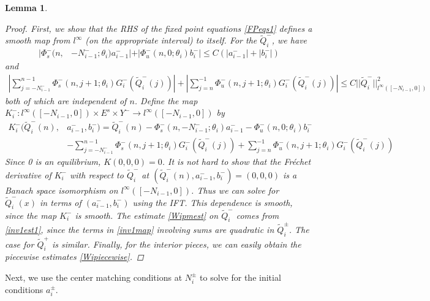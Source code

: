 \documentclass[12pt]{article}
\newtheorem{lemma}{Lemma}
\begin{document}
\begin{lemma}
\begin{proof}
First, we show that the RHS of the fixed point equations \eqref{FPeqs1} defines a smooth map from $l^\infty$ (on the appropriate interval) to itself. For the $\tilde{Q}_i^-$, we have
\begin{align}\label{inv1est1}
|\Phi_s^-(n, &-N_{i-1}^-; \theta_i) a_{i-1}^-| + |\Phi_u^-(n, 0; \theta_i) b_i^-| \leq C ( |a_{i-1}^-| + |b_i^-|) 
\end{align}
and
\begin{align*}
\left| \sum_{j = -N_{i-1}^-}^{n-1} \Phi_s^-(n, j+1; \theta_i) G_i^-(\tilde{Q}_i^-(j))\right| + \left|\sum_{j = n}^{-1} \Phi_u^-(n, j+1; \theta_i) G_i^-(\tilde{Q}_i^-(j))\right| 
\leq C ||\tilde{Q}_i^-||_{l^\infty([-N_{i-1}, 0])}^2 
\end{align*}
both of which are independent of $n$. Define the map
$K_i^-: l^\infty([-N_{i-1}, 0]) \times E^s \times Y^- \rightarrow l^\infty([-N_{i-1}, 0])$ by
\begin{align}\label{inv1map}
K_i^-(\tilde{Q}_i^-(n), &a_{i-1}^-, b_i^-) = \tilde{Q}_i^-(n) - \Phi_s^-(n, -N_{i-1}^-; \theta_i) a_{i-1}^- - \Phi_u^-(n, 0; \theta_i) b_i^-  \\
&- \sum_{j = -N_{i-1}^-}^{n-1} \Phi_s^-(n, j+1; \theta_i) G_i^-(\tilde{Q}_i^-(j)) + \sum_{j = n}^{-1} \Phi_u^-(n, j+1; \theta_i) G_i^-(\tilde{Q}_i^-(j)) \nonumber
\end{align}
Since 0 is an equilibrium, $K(0, 0, 0) = 0$. It is not hard to show that the Fr\'echet derivative of $K_i^-$ with respect to $\tilde{Q}_i^-$ at $(\tilde{Q}_i^-(n), a_{i-1}^-, b_i^-) = (0, 0, 0)$ is a Banach space isomorphism on $l^\infty([-N_{i-1}, 0])$. Thus we can solve for $\tilde{Q}_i^-(x)$ in terms of $(a_{i-1}^-, b_i^-)$ using the IFT. This dependence is smooth, since the map $K_i^-$ is smooth. The estimate \eqref{Wipmest} on $\tilde{Q}_i^-$ comes from \eqref{inv1est1}, since the terms in \eqref{inv1map} involving sums are quadratic in $\tilde{Q}_i^\pm$. The case for $\tilde{Q}_i^+$ is similar. Finally, for the interior pieces, we can easily obtain the piecewise estimates \eqref{Wipiecewise}.
\end{proof}
\end{lemma}

Next, we use the center matching conditions at $N_i^\pm$ to solve for the initial conditions $a_i^\pm$.
\end{document}
